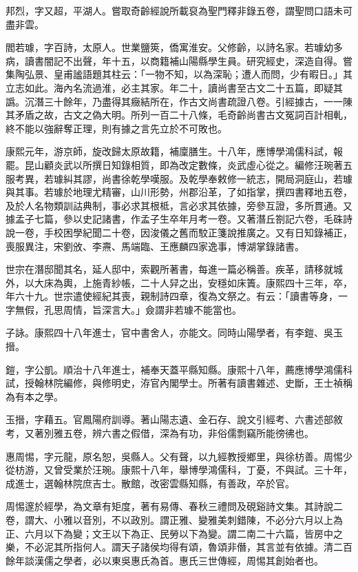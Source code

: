 \begin{pinyinscope}
邦烈，字又超，平湖人。嘗取奇齡經說所載裒為聖門釋非錄五卷，謂聖問口語未可盡非雲。

閻若璩，字百詩，太原人。世業鹽筴，僑寓淮安。父修齡，以詩名家。若璩幼多病，讀書闇記不出聲，年十五，以商籍補山陽縣學生員。研究經史，深造自得。嘗集陶弘景、皇甫謐語題其柱云：「一物不知，以為深恥；遭人而問，少有暇日。」其立志如此。海內名流過淮，必主其家。年二十，讀尚書至古文二十五篇，即疑其譌。沉潛三十餘年，乃盡得其癥結所在，作古文尚書疏證八卷。引經據古，一一陳其矛盾之故，古文之偽大明。所列一百二十八條，毛奇齡尚書古文冤詞百計相軋，終不能以強辭奪正理，則有據之言先立於不可敗也。

康熙元年，游京師，旋改歸太原故籍，補廩膳生。十八年，應博學鴻儒科試，報罷。昆山顧炎武以所撰日知錄相質，即為改定數條，炎武虛心從之。編修汪琬著五服考異，若璩糾其謬，尚書徐乾學嘆服。及乾學奉敕修一統志，開局洞庭山，若璩與其事。若璩於地理尤精審，山川形勢，州郡沿革，了如指掌，撰四書釋地五卷，及於人名物類訓詁典制，事必求其根柢，言必求其依據，旁參互證，多所貫通。又據孟子七篇，參以史記諸書，作孟子生卒年月考一卷。又著潛丘劄記六卷，毛硃詩說一卷，手校困學紀聞二十卷，因浚儀之舊而駮正箋說推廣之。又有日知錄補正，喪服異注，宋劉攽、李燾、馬端臨、王應麟四家逸事，博湖掌錄諸書。

世宗在潛邸聞其名，延人邸中，索觀所著書，每進一篇必稱善。疾革，請移就城外，以大床為輿，上施青紗帳，二十人舁之出，安穩如床簀。康熙四十三年，卒，年六十九。世宗遣使經紀其喪，親制詩四章，復為文祭之。有云：「讀書等身，一字無假，孔思周情，旨深言大。」僉謂非若璩不能當也。

子詠。康熙四十八年進士，官中書舍人，亦能文。同時山陽學者，有李鎧、吳玉搢。

鎧，字公凱。順治十八年進士，補奉天蓋平縣知縣。康熙十八年，薦應博學鴻儒科試，授翰林院編修，與修明史，洊官內閣學士。所著有讀書雜述、史斷，王士禎稱為有本之學。

玉搢，字藉五。官鳳陽府訓導。著山陽志遺、金石存、說文引經考、六書述部敘考，又著別雅五卷，辨六書之假借，深為有功，非俗儒剽竊所能徬彿也。

惠周惕，字元龍，原名恕，吳縣人。父有聲，以九經教授鄉里，與徐枋善。周惕少從枋游，又曾受業於汪琬。康熙十八年，舉博學鴻儒科，丁憂，不與試。三十年，成進士，選翰林院庶吉士。散館，改密雲縣知縣，有善政，卒於官。

周惕邃於經學，為文章有矩度，著有易傳、春秋三禮問及硯谿詩文集。其詩說二卷，謂大、小雅以音別，不以政別。謂正雅、變雅美刺錯陳，不必分六月以上為正、六月以下為變；文王以下為正、民勞以下為變。謂二南二十六篇，皆房中之樂，不必泥其所指何人。謂天子諸侯均得有頌，魯頌非僭，其言並有依據。清二百餘年談漢儒之學者，必以東吳惠氏為首。惠氏三世傳經，周惕其創始者也。


\end{pinyinscope}
